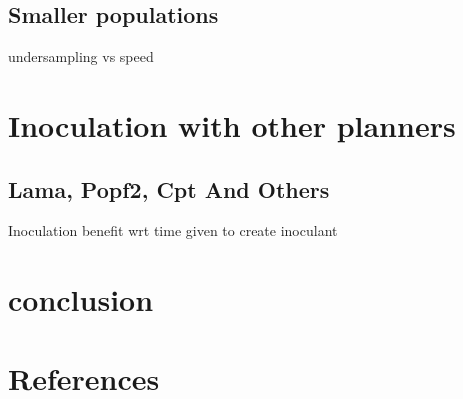 \documentclass[english]{DESCARWINreport}
\begin{document}
\section{Smaller populations}

undersampling vs speed




\chapter{Inoculation with other planners}

\section{Lama, Popf2, Cpt And Others}

Inoculation benefit wrt time given to create inoculant



\chapter{conclusion}



\chapter{References}





%
%
%
\end{document}
